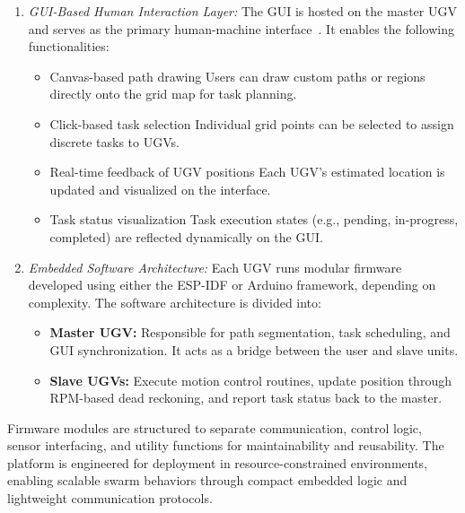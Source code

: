 \documentclass[conference]{IEEEtran}
\begin{document}
\begin{enumerate}
\item {\em GUI-Based Human Interaction Layer:}
The GUI is hosted on the master UGV and serves as the primary human-machine interface~\cite{randomnerd2024esp32}. It enables the following functionalities:
\begin{itemize}
    \item Canvas-based path drawing Users can draw custom paths or regions directly onto the grid map for task planning.
    \item Click-based task selection Individual grid points can be selected to assign discrete tasks to UGVs.
    \item Real-time feedback of UGV positions Each UGV's estimated location is updated and visualized on the interface.
    \item Task status visualization Task execution states (e.g., pending, in-progress, completed) are reflected dynamically on the GUI.
\end{itemize}
%
\item {\em Embedded Software Architecture:}
Each UGV runs modular firmware developed using either the ESP-IDF or Arduino framework, depending on complexity. The software architecture is divided into:
\begin{itemize}
    \item \textbf{Master UGV:} Responsible for path segmentation, task scheduling, and GUI synchronization. It acts as a bridge between the user and slave units.
    \item \textbf{Slave UGVs:} Execute motion control routines, update position through RPM-based dead reckoning, and report task status back to the master.
\end{itemize}
\end{enumerate}

Firmware modules are structured to separate communication, control logic, sensor interfacing, and utility functions for maintainability and reusability. The platform is engineered for deployment in resource-constrained environments, enabling scalable swarm behaviors through compact embedded logic and lightweight communication protocols.
\end{document}

